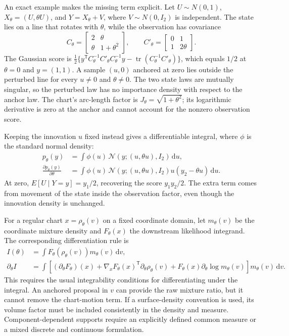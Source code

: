 \documentclass[11pt]{article}
\newcommand{\dd}{\mathrm{d}}
\begin{document}
An exact example makes the missing term explicit.  Let $U\sim N(0,1)$,
$X_\theta=(U,\theta U)$, and $Y=X_\theta+V$, where $V\sim N(0,I_2)$ is
independent.  The state lies on a line that rotates with $\theta$, while the
observation has covariance
\begin{equation}
 C_\theta=\begin{bmatrix}2&\theta\\\theta&1+\theta^2\end{bmatrix},
 \qquad
 C'_\theta=\begin{bmatrix}0&1\\1&2\theta\end{bmatrix}.
 \label{eq:moving-support-covariance}
\end{equation}
The Gaussian score is
$\tfrac12\{y^\mathsf{T}C_\theta^{-1}C'_\theta C_\theta^{-1}y
-\operatorname{tr}(C_\theta^{-1}C'_\theta)\}$, which equals $1/2$ at
$\theta=0$ and $y=(1,1)$.  A sample $(u,0)$ anchored at zero lies outside
the perturbed line for every $u\ne0$ and $\theta\ne0$.  The two state laws
are mutually singular, so the perturbed law has no importance density with
respect to the anchor law.  The chart's arc-length factor is
$J_\theta=\sqrt{1+\theta^2}$; its logarithmic derivative is zero at the
anchor and cannot account for the nonzero observation score.

Keeping the innovation $u$ fixed instead gives a differentiable integral,
where $\phi$ is the standard normal density:
\begin{align}
 p_\theta(y)
   &=\int \phi(u)\,\mathcal N(y;(u,\theta u),I_2)\,\dd u,\\
 \frac{\partial p_\theta(y)}{\partial\theta}
   &=\int \phi(u)\,\mathcal N(y;(u,\theta u),I_2)
                 u(y_2-\theta u)\,\dd u.
 \label{eq:moving-support-score}
\end{align}
At zero, $E[U\mid Y=y]=y_1/2$, recovering the score $y_1y_2/2$.
The extra term comes from movement of the state inside the observation
factor, even though the innovation density is unchanged.

For a regular chart $x=\rho_\theta(v)$ on a fixed coordinate domain, let
$m_\theta(v)$ be the coordinate mixture density and $F_\theta(x)$ the
downstream likelihood integrand.  The corresponding differentiation rule is
\begin{align}
 I(\theta)&=\int F_\theta(\rho_\theta(v))m_\theta(v)\,\dd v,\\
 \partial_\theta I
 &=\int\!\left[
   (\partial_\theta F_\theta)(x)
   +\nabla_xF_\theta(x)^\mathsf{T}\partial_\theta\rho_\theta(v)
   +F_\theta(x)\partial_\theta\log m_\theta(v)
   \right]m_\theta(v)\,\dd v.
 \label{eq:chart-total-expectation}
\end{align}
This requires the usual integrability conditions for differentiating under
the integral.  An anchored proposal in $v$ can provide the raw mixture ratio,
but it cannot remove the chart-motion term.  If a surface-density convention
is used, its volume factor must be included consistently in the density and
measure.  Component-dependent supports require an explicitly defined common
measure or a mixed discrete and continuous formulation.
\end{document}

